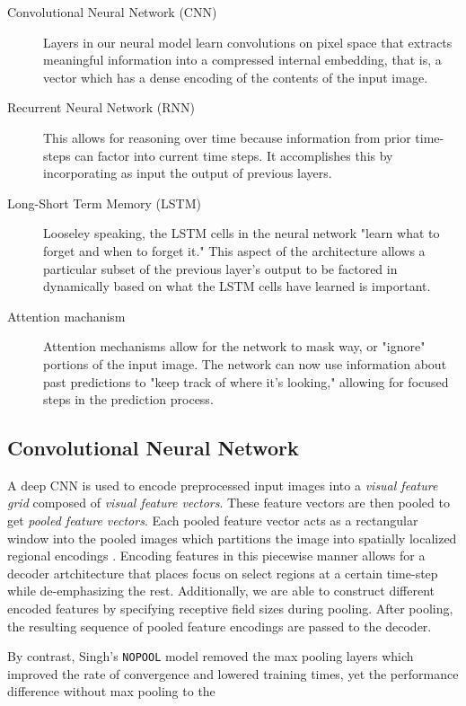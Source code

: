 \documentclass[12pt]{article}
\begin{document}
\begin{description}
  \item[Convolutional Neural Network (CNN)] Layers in our neural model learn
  convolutions on pixel space that extracts meaningful information into a
  compressed internal embedding, that is, a vector which has a dense encoding of
  the contents of the input image.
  \item[Recurrent Neural Network (RNN)] This allows for reasoning over time
  because information from prior time-steps can factor into current time steps.
  It accomplishes this by incorporating as input the output of previous layers.
  \item[Long-Short Term Memory (LSTM)] Looseley speaking, the LSTM cells in the
  neural network "learn what to forget and when to forget it." This aspect of
  the architecture allows a particular subset of the previous layer's output to
  be factored in dynamically based on what the LSTM cells have learned is
  important.
  \item[Attention machanism] Attention mechanisms allow for the network to mask
  way, or "ignore" portions of the input image. The network can now use
  information about past predictions to "keep track of where it's looking," allowing
  for focused steps in the prediction process.
\end{description}

\subsection{Convolutional Neural Network}

A deep CNN is used to encode preprocessed input images into a \textit{visual
feature grid} composed of \textit{visual feature vectors}. These feature vectors
are then pooled to get \textit{pooled feature vectors}. Each pooled feature
vector acts as a rectangular window into the pooled images which partitions the
image into spatially localized regional encodings \parencite{singh2018teaching}.
Encoding features in this piecewise manner allows for a decoder artchitecture
that places focus on select regions at a certain time-step while de-emphasizing
the rest. Additionally, we are able to construct different encoded features by
specifying receptive field sizes during pooling. After pooling, the resulting
sequence of pooled feature encodings are passed to the decoder.

By contrast, Singh's \texttt{NOPOOL} model removed the max pooling layers which
improved the rate of convergence and lowered training times, yet the performance
difference without max pooling to the 
\end{document}
